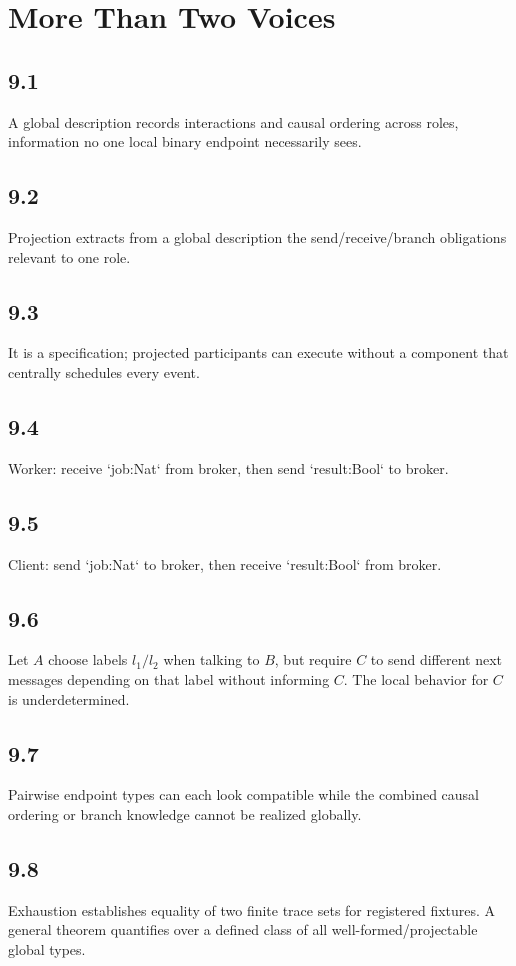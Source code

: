 \chapter{More Than Two Voices}

\section*{9.1}
A global description records interactions and causal ordering across roles, information no one local binary endpoint necessarily sees.

\section*{9.2}
Projection extracts from a global description the send/receive/branch obligations relevant to one role.

\section*{9.3}
It is a specification; projected participants can execute without a component that centrally schedules every event.

\section*{9.4}
Worker: receive `job:Nat` from broker, then send `result:Bool` to broker.

\section*{9.5}
Client: send `job:Nat` to broker, then receive `result:Bool` from broker.

\section*{9.6}
Let $A$ choose labels $l_1/l_2$ when talking to $B$, but require $C$ to send different next messages depending on that label without informing $C$. The local behavior for $C$ is underdetermined.

\section*{9.7}
Pairwise endpoint types can each look compatible while the combined causal ordering or branch knowledge cannot be realized globally.

\section*{9.8}
Exhaustion establishes equality of two finite trace sets for registered fixtures. A general theorem quantifies over a defined class of all well-formed/projectable global types.

